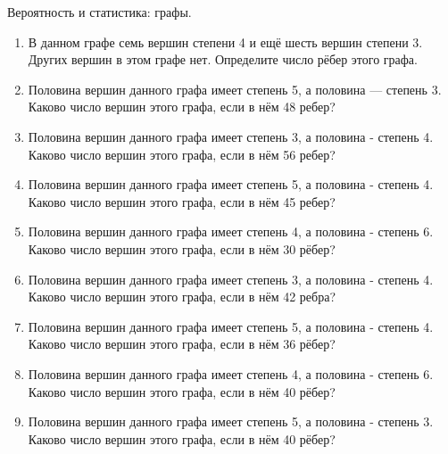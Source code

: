 \documentclass[a4paper,12pt]{article}
\newcommand{\taskspace}{\par\vspace{0.42cm}}
\newcommand{\blocknote}[1]{%
  {\color{soft}\small #1\par}\vspace{0.25cm}%
}
\begin{document}
\blocknote{Вероятность и статистика: графы.}

\begin{enumerate}[resume]

\item В данном графе семь вершин степени 4 и ещё шесть вершин степени 3. Других вершин в этом графе нет. Определите число рёбер этого графа.

\taskspace

\item Половина вершин данного графа имеет степень 5, а половина --- степень 3. Каково число вершин этого графа, если в нём 48 ребер?

\taskspace

\item Половина вершин данного графа имеет степень 3, а половина - степень 4. Каково число вершин этого графа, если в нём 56 ребер?

\taskspace

\item Половина вершин данного графа имеет степень 5, а половина - степень 4. Каково число вершин этого графа, если в нём 45 ребер?

\taskspace

\item Половина вершин данного графа имеет степень 4, а половина - степень 6. Каково число вершин этого графа, если в нём 30 рёбер?

\taskspace

\item Половина вершин данного графа имеет степень 3, а половина - степень 4. Каково число вершин этого графа, если в нём 42 ребра?

\taskspace

\item Половина вершин данного графа имеет степень 5, а половина - степень 4. Каково число вершин этого графа, если в нём 36 рёбер?

\taskspace

\item Половина вершин данного графа имеет степень 4, а половина - степень 6. Каково число вершин этого графа, если в нём 40 рёбер?

\taskspace

\item Половина вершин данного графа имеет степень 5, а половина - степень 3. Каково число вершин этого графа, если в нём 40 рёбер?


\end{enumerate}
\end{document}
